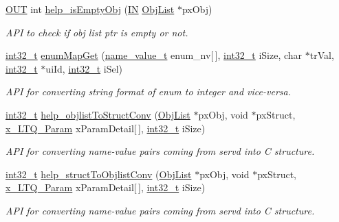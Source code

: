 \begin{DoxyCompactItemize}
\hyperlink{group__LIBHELP_gaec78e7a9e90a406a56f859ee456e8eae}{O\-U\-T} int \hyperlink{group__LIBHELP_ga418f69e510dd850553cc3bb618dcd23c}{help\-\_\-is\-Empty\-Obj} (\hyperlink{group__LIBHELP_gac2bbd6d630a06a980d9a92ddb9a49928}{I\-N} \hyperlink{structObjList}{Obj\-List} $\ast$px\-Obj)
\begin{DoxyCompactList}\small\item\em A\-P\-I to check if obj list ptr is empty or not. \end{DoxyCompactList}\item 
\hyperlink{commondefs_8h_a32f2e37ee053cf2ce8ca28d1f74630e5}{int32\-\_\-t} \hyperlink{group__LIBHELP_ga150ff6f76ba6396d5e81bc584bac0ae8}{enum\-Map\-Get} (\hyperlink{structname__value__t}{name\-\_\-value\-\_\-t} enum\-\_\-nv\mbox{[}$\,$\mbox{]}, \hyperlink{commondefs_8h_a32f2e37ee053cf2ce8ca28d1f74630e5}{int32\-\_\-t} i\-Size, char $\ast$tr\-Val, \hyperlink{commondefs_8h_a32f2e37ee053cf2ce8ca28d1f74630e5}{int32\-\_\-t} $\ast$ui\-Id, \hyperlink{commondefs_8h_a32f2e37ee053cf2ce8ca28d1f74630e5}{int32\-\_\-t} i\-Sel)
\begin{DoxyCompactList}\small\item\em A\-P\-I for converting string format of enum to integer and vice-\/versa. \end{DoxyCompactList}\item 
\hyperlink{commondefs_8h_a32f2e37ee053cf2ce8ca28d1f74630e5}{int32\-\_\-t} \hyperlink{group__LIBHELP_ga08300bca1af4dcd87c17484ba5423465}{help\-\_\-objlist\-To\-Struct\-Conv} (\hyperlink{structObjList}{Obj\-List} $\ast$px\-Obj, void $\ast$px\-Struct, \hyperlink{structx__LTQ__Param}{x\-\_\-\-L\-T\-Q\-\_\-\-Param} x\-Param\-Detail\mbox{[}$\,$\mbox{]}, \hyperlink{commondefs_8h_a32f2e37ee053cf2ce8ca28d1f74630e5}{int32\-\_\-t} i\-Size)
\begin{DoxyCompactList}\small\item\em A\-P\-I for converting name-\/value pairs coming from servd into C structure. \end{DoxyCompactList}\item 
\hyperlink{commondefs_8h_a32f2e37ee053cf2ce8ca28d1f74630e5}{int32\-\_\-t} \hyperlink{group__LIBHELP_ga28a2489527017209b1597af38de0486c}{help\-\_\-struct\-To\-Objlist\-Conv} (\hyperlink{structObjList}{Obj\-List} $\ast$px\-Obj, void $\ast$px\-Struct, \hyperlink{structx__LTQ__Param}{x\-\_\-\-L\-T\-Q\-\_\-\-Param} x\-Param\-Detail\mbox{[}$\,$\mbox{]}, \hyperlink{commondefs_8h_a32f2e37ee053cf2ce8ca28d1f74630e5}{int32\-\_\-t} i\-Size)
\begin{DoxyCompactList}\small\item\em A\-P\-I for converting name-\/value pairs coming from servd into C structure. \end{DoxyCompactList}\item 

\end{DoxyCompactItemize}
